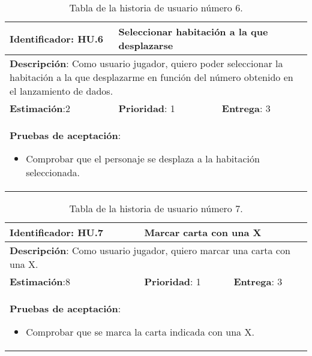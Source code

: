 \begin{table}[h]
  \begin{center}
    \begin{tabular}{|p{4cm}|p{4cm}|p{4cm}|}

    \hline
    \textbf{Identificador}: HU.6
    & \multicolumn{2}{p{8cm}|}{Seleccionar habitación a la que desplazarse}\\

    \hline
    \multicolumn{3}{|p{12cm}|}{\textbf{Descripción}: Como usuario jugador, quiero poder seleccionar la habitación a la que desplazarme en función del número obtenido en el lanzamiento de dados.}\\

    \hline
    \textbf{Estimación}:2
    & \textbf{Prioridad}: 1
    & \textbf{Entrega}: 3\\

    \hline
    \multicolumn{3}{|p{12cm}|}{\textbf{Pruebas de aceptación}:
      \begin{itemize}
        \item Comprobar que el personaje se desplaza a la habitación seleccionada.
      \end{itemize}
    }\\

    \hline

    \end{tabular}

    \caption{Tabla de la historia de usuario número 6.}
    \label{tabla-hu6}

  \end{center}
\end{table}

\begin{table}[h]
  \begin{center}
    \begin{tabular}{|p{4cm}|p{4cm}|p{4cm}|}

    \hline
    \textbf{Identificador}: HU.7
    & \multicolumn{2}{p{8cm}|}{Marcar carta con una X}\\

    \hline
    \multicolumn{3}{|p{12cm}|}{\textbf{Descripción}: Como usuario jugador, quiero marcar una carta con una X.}\\

    \hline
    \textbf{Estimación}:8
    & \textbf{Prioridad}: 1
    & \textbf{Entrega}: 3\\

    \hline
    \multicolumn{3}{|p{12cm}|}{\textbf{Pruebas de aceptación}:
      \begin{itemize}
        \item Comprobar que se marca la carta indicada con una X.
      \end{itemize}
    }\\

    \hline

    \end{tabular}

    \caption{Tabla de la historia de usuario número 7.}
    \label{tabla-hu7}

  \end{center}
\end{table}

